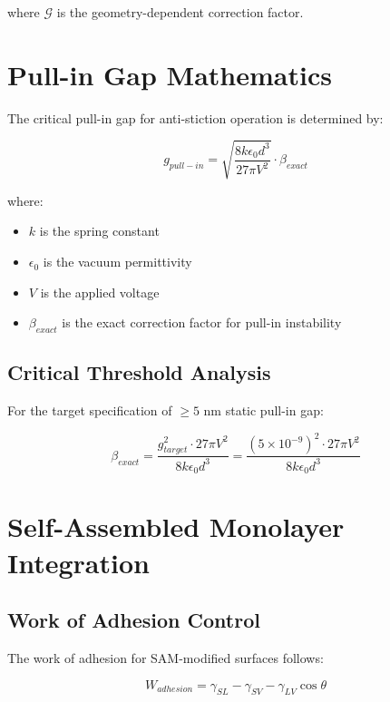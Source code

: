 \documentclass{article}
\begin{document}
where $\mathcal{G}$ is the geometry-dependent correction factor.

\section{Pull-in Gap Mathematics}

The critical pull-in gap for anti-stiction operation is determined by:

\begin{equation}\label{eq:pull_in_gap}
g_{pull-in} = \sqrt{\frac{8k \epsilon_0 d^3}{27 \pi V^2}} \cdot \beta_{exact}
\end{equation}

where:
\begin{itemize}
\item $k$ is the spring constant
\item $\epsilon_0$ is the vacuum permittivity
\item $V$ is the applied voltage
\item $\beta_{exact}$ is the exact correction factor for pull-in instability
\end{itemize}

\subsection{Critical Threshold Analysis}

For the target specification of $\geq 5$ nm static pull-in gap:

\begin{equation}
\beta_{exact} = \frac{g_{target}^2 \cdot 27\pi V^2}{8k\epsilon_0 d^3} = \frac{(5 \times 10^{-9})^2 \cdot 27\pi V^2}{8k\epsilon_0 d^3}
\end{equation}

\section{Self-Assembled Monolayer Integration}

\subsection{Work of Adhesion Control}

The work of adhesion for SAM-modified surfaces follows:

\begin{equation}\label{eq:work_adhesion}
W_{adhesion} = \gamma_{SL} - \gamma_{SV} - \gamma_{LV}\cos\theta
\end{equation}
\end{document}
